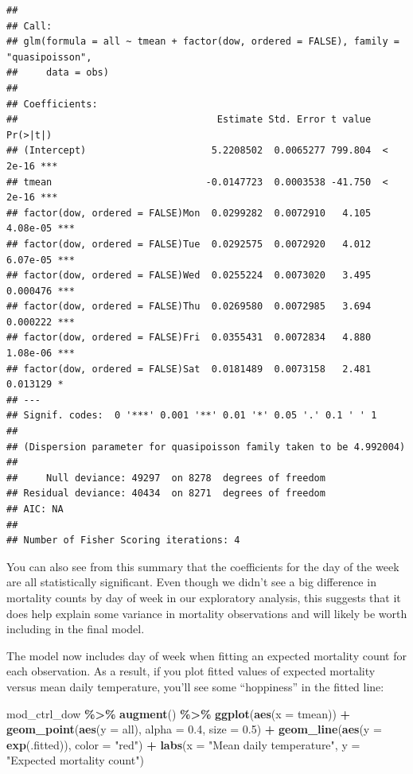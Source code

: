 \documentclass[
]{book}
\newenvironment{Shaded}{\begin{snugshade}}{\end{snugshade}}
\newcommand{\AttributeTok}[1]{\textcolor[rgb]{0.13,0.29,0.53}{#1}}
\newcommand{\FloatTok}[1]{\textcolor[rgb]{0.00,0.00,0.81}{#1}}
\newcommand{\FunctionTok}[1]{\textcolor[rgb]{0.13,0.29,0.53}{\textbf{#1}}}
\newcommand{\NormalTok}[1]{#1}
\newcommand{\SpecialCharTok}[1]{\textcolor[rgb]{0.81,0.36,0.00}{\textbf{#1}}}
\newcommand{\StringTok}[1]{\textcolor[rgb]{0.31,0.60,0.02}{#1}}
\begin{document}
\begin{verbatim}
## 
## Call:
## glm(formula = all ~ tmean + factor(dow, ordered = FALSE), family = "quasipoisson", 
##     data = obs)
## 
## Coefficients:
##                                   Estimate Std. Error t value Pr(>|t|)    
## (Intercept)                      5.2208502  0.0065277 799.804  < 2e-16 ***
## tmean                           -0.0147723  0.0003538 -41.750  < 2e-16 ***
## factor(dow, ordered = FALSE)Mon  0.0299282  0.0072910   4.105 4.08e-05 ***
## factor(dow, ordered = FALSE)Tue  0.0292575  0.0072920   4.012 6.07e-05 ***
## factor(dow, ordered = FALSE)Wed  0.0255224  0.0073020   3.495 0.000476 ***
## factor(dow, ordered = FALSE)Thu  0.0269580  0.0072985   3.694 0.000222 ***
## factor(dow, ordered = FALSE)Fri  0.0355431  0.0072834   4.880 1.08e-06 ***
## factor(dow, ordered = FALSE)Sat  0.0181489  0.0073158   2.481 0.013129 *  
## ---
## Signif. codes:  0 '***' 0.001 '**' 0.01 '*' 0.05 '.' 0.1 ' ' 1
## 
## (Dispersion parameter for quasipoisson family taken to be 4.992004)
## 
##     Null deviance: 49297  on 8278  degrees of freedom
## Residual deviance: 40434  on 8271  degrees of freedom
## AIC: NA
## 
## Number of Fisher Scoring iterations: 4
\end{verbatim}

You can also see from this summary that the coefficients for the day of the
week are all statistically significant. Even though we didn't see a big
difference in mortality counts by day of week in our exploratory analysis,
this suggests that it does help explain some variance in mortality observations
and will likely be worth including in the final model.

The model now includes day of week when fitting an expected mortality count
for each observation. As a result, if you plot fitted values of expected
mortality versus mean daily temperature, you'll see some ``hoppiness'' in the
fitted line:

\begin{Shaded}
\begin{Highlighting}[]
\NormalTok{mod\_ctrl\_dow }\SpecialCharTok{\%\textgreater{}\%} 
  \FunctionTok{augment}\NormalTok{() }\SpecialCharTok{\%\textgreater{}\%} 
  \FunctionTok{ggplot}\NormalTok{(}\FunctionTok{aes}\NormalTok{(}\AttributeTok{x =}\NormalTok{ tmean)) }\SpecialCharTok{+} 
  \FunctionTok{geom\_point}\NormalTok{(}\FunctionTok{aes}\NormalTok{(}\AttributeTok{y =}\NormalTok{ all), }\AttributeTok{alpha =} \FloatTok{0.4}\NormalTok{, }\AttributeTok{size =} \FloatTok{0.5}\NormalTok{) }\SpecialCharTok{+} 
  \FunctionTok{geom\_line}\NormalTok{(}\FunctionTok{aes}\NormalTok{(}\AttributeTok{y =} \FunctionTok{exp}\NormalTok{(.fitted)), }\AttributeTok{color =} \StringTok{"red"}\NormalTok{) }\SpecialCharTok{+} 
  \FunctionTok{labs}\NormalTok{(}\AttributeTok{x =} \StringTok{"Mean daily temperature"}\NormalTok{, }\AttributeTok{y =} \StringTok{"Expected mortality count"}\NormalTok{)}
\end{Highlighting}
\end{Shaded}
\end{document}
